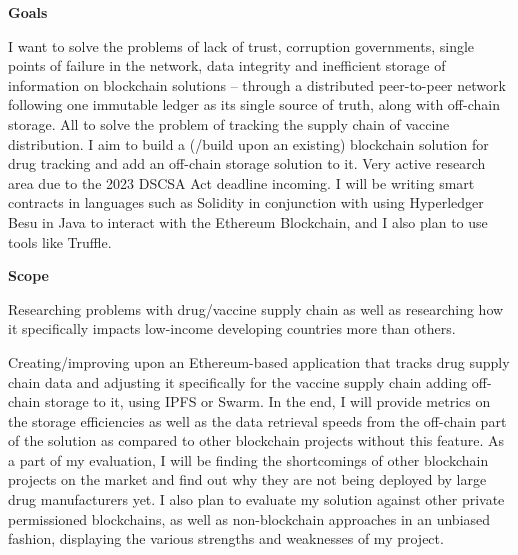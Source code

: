 \large \textbf{Goals}

I want to solve the problems of lack of trust, corruption governments, single points of failure in the network, data integrity and inefficient storage of information on blockchain solutions – through a distributed peer-to-peer network following one immutable ledger as its single source of truth, along with off-chain storage. All to solve the problem of tracking the supply chain of vaccine distribution. I aim to build a (/build upon an existing) blockchain solution for drug tracking and add an off-chain storage solution to it. Very active research area due to the 2023 DSCSA Act deadline incoming. I will be writing smart contracts in languages such as Solidity in conjunction with using Hyperledger Besu in Java to interact with the Ethereum Blockchain, and I also plan to use tools like Truffle. 

\large \textbf{Scope}

Researching problems with drug/vaccine supply chain as well as researching how it specifically impacts low-income developing countries more than others. 

Creating/improving upon an Ethereum-based application that tracks drug supply chain data and adjusting it specifically for the vaccine supply chain adding off-chain storage to it, using IPFS or Swarm. In the end, I will provide metrics on the storage efficiencies as well as the data retrieval speeds from the off-chain part of the solution as compared to other blockchain projects without this feature. As a part of my evaluation, I will be finding the shortcomings of other blockchain projects on the market and find out why they are not being deployed by large drug manufacturers yet. I also plan to evaluate my solution against other private permissioned blockchains, as well as non-blockchain approaches in an unbiased fashion, displaying the various strengths and weaknesses of my project.

